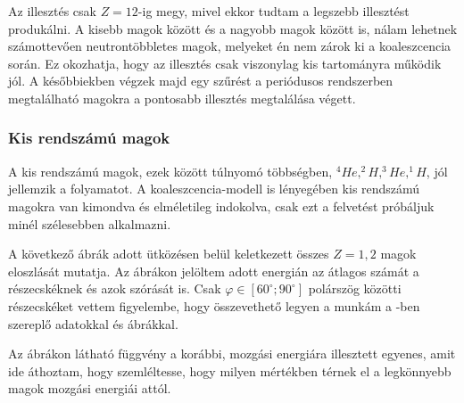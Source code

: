 \documentclass[a4paper,12pt]{article}
\begin{document}
\vspace{5mm}

\par Az illesztés csak $Z = 12$-ig megy, mivel ekkor tudtam a legszebb illesztést produkálni. A kisebb magok között és a nagyobb magok között is, nálam lehetnek számottevően neutrontöbbletes magok, melyeket én nem zárok ki a koaleszcencia során. Ez okozhatja, hogy az illesztés csak viszonylag kis tartományra működik jól. A későbbiekben végzek majd egy szűrést a periódusos rendszerben megtalálható magokra a pontosabb illesztés megtalálása végett.

\vspace{5mm}

\subsubsection{ Kis rendszámú magok }

\vspace{5mm}

\par A kis rendszámú magok, ezek között túlnyomó többségben, $^{4}He, ^{2}H, ^{3}He, ^{1}H$, jól jellemzik a folyamatot. A koaleszcencia-modell is lényegében kis rendszámú magokra van kimondva és elméletileg indokolva, csak ezt a felvetést próbáljuk minél szélesebben alkalmazni. 

\vspace{5mm}

\par A következő ábrák adott ütközésen belül keletkezett összes $Z = 1, 2$ magok eloszlását mutatja. Az ábrákon jelöltem adott energián az átlagos számát a részecskéknek és azok szórását is. Csak $\varphi \in [60^{\circ};90^{\circ}]$ polárszög közötti részecskéket vettem figyelembe, hogy összevethető legyen a munkám a \cite{REISDORF1997493}-ben szereplő adatokkal és ábrákkal.

\vspace{5mm}

\par Az ábrákon látható függvény a korábbi, mozgási energiára illesztett egyenes, amit ide áthoztam, hogy szemléltesse, hogy milyen mértékben térnek el a legkönnyebb magok mozgási energiái attól.

\vspace{5mm}
\end{document}
